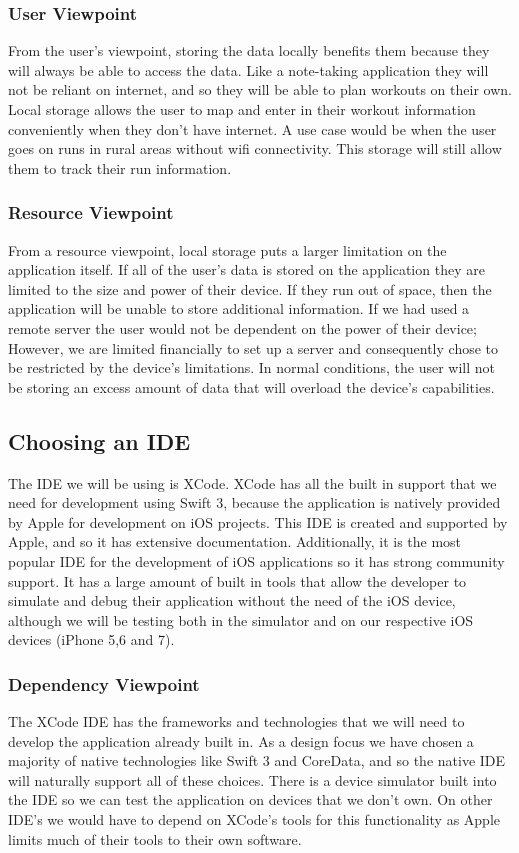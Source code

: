 \documentclass[letterpaper,10pt,titlepage]{article}
\begin{document}
\subsubsection{User Viewpoint}
From the user’s viewpoint, storing the data locally benefits them because they will always be able to access the data. Like a note-taking application they will not be reliant on internet, and so they will be able to plan workouts on their own. Local storage allows the user to map and enter in their workout information conveniently when they don’t have internet. A use case would be when the user goes on runs in rural areas without wifi connectivity. This storage will still allow them to track their run information.

\subsubsection{Resource Viewpoint}
From a resource viewpoint, local storage puts a larger limitation on the application itself. If all of the user’s data is stored on the application they are limited to the size and power of their device. If they run out of space, then the application will be unable to store additional information. If we had used a remote server the user would not be dependent on the power of their device; However, we are limited financially to set up a server and consequently chose to be restricted by the device’s limitations. In normal conditions, the user will not be storing an excess amount of data that will overload the device’s capabilities.


\subsection{Choosing an IDE}
The IDE we will be using is XCode. XCode has all the built in support that we need for development using Swift 3, because the application is natively provided by Apple for development on iOS projects. This IDE is created and supported by Apple, and so it has extensive documentation. Additionally, it is the most popular IDE for the development of iOS applications so it has strong community support. It has a large amount of built in tools that allow the developer to simulate and debug their application without the need of the iOS device, although we will be testing both in the simulator and on our respective iOS devices (iPhone 5,6 and 7).

\subsubsection{Dependency Viewpoint}
The XCode IDE has the frameworks and technologies that we will need to develop the application already built in. As a design focus we have chosen a majority of native technologies like Swift 3 and CoreData, and so the native IDE will naturally support all of these choices. There is a device simulator built into the IDE so we can test the application on devices that we don’t own. On other IDE’s we would have to depend on XCode’s tools for this functionality as Apple limits much of their tools to their own software.
\end{document}
